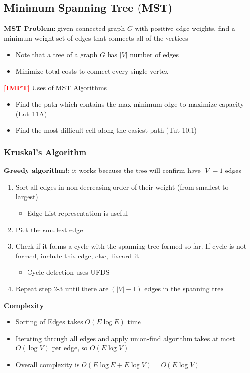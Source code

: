 \documentclass{article}
\newcommand{\impt}[0]{\textcolor{red}{\textbf{[IMPT] }}}
\begin{document}
\begin{multicols}{2}
\subsection{Minimum Spanning Tree (MST)}
\textbf{MST Problem}: given connected graph $G$ with positive edge weights, find a minimum weight set of edges that connects all of the vertices
\begin{itemize}
	\item Note that a tree of a graph $G$ has $|V|$ number of edges
	\item Minimize total costs to connect every single vertex
\end{itemize}
\impt Uses of MST Algorithms
\begin{itemize}
	\item Find the path which contains the max minimum edge to maximize capacity (Lab 11A)
	\item Find the most difficult cell along the easiest path (Tut 10.1)
\end{itemize}
\subsubsection{Kruskal's Algorithm}
\textbf{Greedy algorithm!}: it works because the tree will confirm have $|V|-1$ edges
\begin{enumerate}
	\item Sort all edges in non-decreasing order of their weight (from smallest to largest)
	\begin{itemize}
		\item Edge List representation is useful
	\end{itemize}
    \item Pick the smallest edge
    \item Check if it forms a cycle with the spanning tree formed so far. If cycle is not formed, include this edge, else, discard it
    \begin{itemize}
    	\item Cycle detection uses UFDS
    \end{itemize}
    \item Repeat step 2-3 until there are $(|V|-1)$ edges in the spanning tree
\end{enumerate}
\textbf{Complexity}
\begin{itemize}
	\item Sorting of Edges takes $O(E \log{E})$ time
	\item Iterating through all edges and apply union-find algorithm takes at most $O(\log{V})$ per edge, so $O(E\log{V})$
	\item Overall complexity is $O(E\log{E} + E\log{V}) = O(E\log{V})$
\end{itemize}


\end{multicols}
\end{document}
